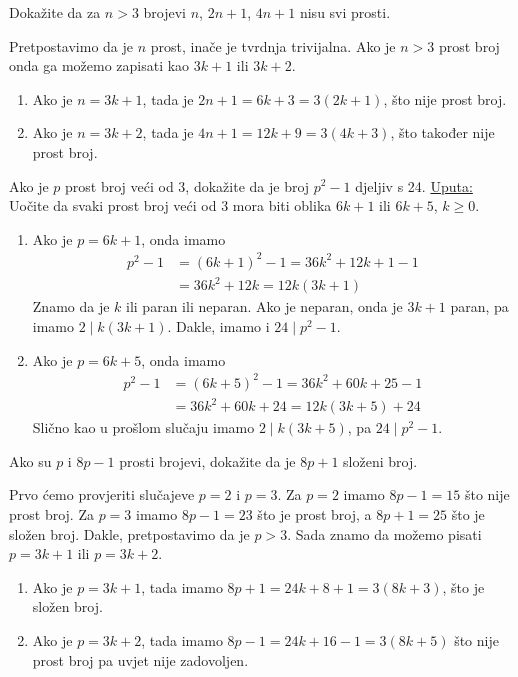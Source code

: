 \documentclass{exam}
\begin{document}
\begin{questions}
\pagebreak

\question Dokažite da za $n > 3$ brojevi $n$, $2n + 1$, $4n + 1$ nisu svi prosti.

\begin{solution}
  Pretpostavimo da je $n$ prost, inače je tvrdnja trivijalna. Ako je $n > 3$ prost broj onda ga možemo zapisati kao $3k + 1$ ili $3k + 2$.
  \begin{enumerate}
    \item Ako je $n = 3k + 1$, tada je $2n + 1 = 6k + 3 = 3(2k + 1)$, što nije prost broj.
    \item Ako je $n = 3k + 2$, tada je $4n + 1 = 12k + 9 = 3(4k + 3)$, što također nije prost broj.
  \end{enumerate}
\end{solution}

\question Ako je $p$ prost broj veći od 3, dokažite da je broj $p^2 - 1$ djeljiv s 24. \newline
\underline{Uputa:} Uočite da svaki prost broj veći od 3 mora biti oblika $6k + 1$ ili $6k + 5$, $k \geq 0$.

\begin{solution}
  \begin{enumerate}
    \item Ako je $p = 6k + 1$, onda imamo
      \begin{align*}
        p^2 - 1 &= (6k + 1)^2 - 1 = 36k^2 + 12k + 1 - 1\\
        &= 36k^2 + 12k = 12k(3k + 1)
      \end{align*}
      Znamo da je $k$ ili paran ili neparan. Ako je neparan, onda je $3k + 1$ paran, pa imamo $2 \mid k (3k + 1)$. Dakle, imamo i $24 \mid p^2 - 1$.
    \item Ako je $p = 6k + 5$, onda imamo
      \begin{align*}
        p^2 - 1 &= (6k + 5)^2 - 1 = 36k^2 + 60k + 25 - 1\\
        &= 36k^2 + 60k + 24 = 12k(3k + 5) + 24
      \end{align*}
      Slično kao u prošlom slučaju imamo $2 \mid k(3k + 5)$, pa $24 \mid p^2 - 1$.
  \end{enumerate}
\end{solution}

\question Ako su $p$ i $8p - 1$ prosti brojevi, dokažite da je $8p + 1$ složeni broj.

\begin{solution}
  Prvo ćemo provjeriti slučajeve $p = 2$ i $p = 3$. Za $p = 2$ imamo $8p - 1 = 15$ što nije prost broj. Za $p = 3$ imamo $8p - 1 = 23$ što je prost broj, a $8p + 1 = 25$ što je složen broj. Dakle, pretpostavimo da je $p > 3$. Sada znamo da možemo pisati $p = 3k + 1$ ili $p = 3k + 2$.
  \begin{enumerate}
    \item Ako je $p = 3k + 1$, tada imamo $8p + 1 = 24k + 8 + 1 = 3(8k + 3)$, što je složen broj.
    \item Ako je $p = 3k + 2$, tada imamo $8p - 1 = 24k + 16 - 1 = 3(8k + 5)$ što nije prost broj pa uvjet nije zadovoljen.
  \end{enumerate}
\end{solution}


\end{questions}
\end{document}
